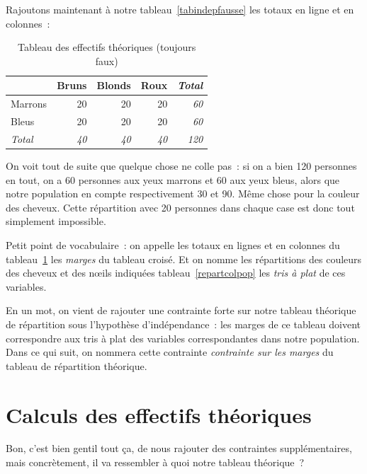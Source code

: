 \documentclass[a4paper,10pt,twoside,francais]{report}
\begin{document}
Rajoutons maintenant à notre tableau~\ref{tabindepfausse} les totaux
en ligne et en colonnes~:

\begin{table}[H]
  \begin{center}
    \begin{tabular}{lrrr>{\itshape}r}
      \toprule
      & Bruns & Blonds & Roux & Total\\
      \midrule
      Marrons & 20 & 20 & 20 & 60 \\
      Bleus & 20 & 20 & 20 & 60 \\
      \textit{Total} & \textit{40} & \textit{40} & \textit{40} & 120 \\
      \bottomrule
    \end{tabular}
    \caption{Tableau des effectifs théoriques (toujours faux)}
    \label{tabindepfaussetot}
  \end{center}
\end{table}


On voit tout de suite que quelque chose ne colle pas~: si on a bien
120 personnes en tout, on a 60 personnes aux yeux marrons et 60 aux
yeux bleus, alors que notre population en compte respectivement 30 et
90. Même chose pour la couleur des cheveux. Cette répartition avec 20
personnes dans chaque case est donc tout simplement impossible.

Petit point de vocabulaire~: on appelle les totaux en lignes et en
colonnes du tableau~\ref{tabindepfaussetot} les
\textit{marges} du tableau croisé. Et on nomme les répartitions des
couleurs des cheveux et des n\oe{}ils indiquées tableau~\ref{repartcolpop}
les \textit{tris à plat} de ces variables.

En un mot, on vient de rajouter une contrainte forte sur notre tableau
théorique de répartition sous l'hypothèse d'indépendance~: les marges
de ce tableau doivent correspondre aux tris à plat des variables
correspondantes dans notre population. Dans ce qui suit, on nommera
cette contrainte \textit{contrainte sur les marges} du tableau de
répartition théorique.

\section{Calculs des effectifs théoriques}
\label{ssec-calctheo}

Bon, c'est bien gentil tout ça, de nous rajouter des contraintes
supplémentaires, mais concrètement, il va ressembler à quoi notre
tableau théorique~?
\end{document}
